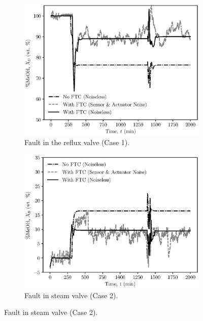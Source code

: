 \begin{figure}[H]
    \begin{center}
    \begin{subfigure}[b]{0.49\textwidth}
        \includegraphics[width=\textwidth]{images/ftc/Case1_Plot.eps}
        \caption{\label{fig:case_study1} Fault in the reflux valve (Case 1).}
    \end{subfigure}
    \hfill
    \begin{subfigure}[b]{0.49\textwidth}
        \includegraphics[width=\textwidth]{images/ftc/Case2_Plot.eps}
        \caption{\label{fig:case_study2} Fault in steam valve (Case 2).}
    \end{subfigure}
    \end{center}
\end{figure}

